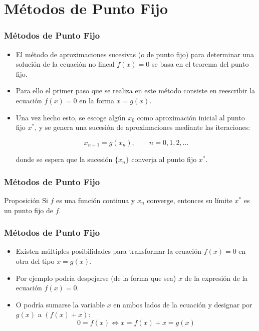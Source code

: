 \documentclass{beamer}
\begin{document}
\section{M\'etodos de Punto Fijo}
\begin{frame}
  \frametitle{M\'etodos de Punto Fijo}
  \begin{itemize}
    \item<1-> El m\'etodo de aproximaciones sucesivas (o de punto fijo) 
    para determinar una soluci\'on de la ecuaci\'on no lineal $f(x)=0$
    se basa en el teorema del punto fijo. 
    \item<2-> Para ello el primer paso que se realiza en este m\'etodo consiste
    en reescribir la ecuaci\'on $f(x)=0$ en la forma $x = g(x)$.
    \item<3-> Una vez hecho esto, se escoge alg\'un $x_0$ como aproximaci\'on inicial al punto fijo
    $x^*$, y se genera una sucesi\'on de aproximaciones mediante las iteraciones:
    \begin{block}{}
        $$
        x_{n+1} = g(x_n), \qquad n=0,1,2,\ldots
        $$
    \end{block}
    donde se espera que la sucesi\'on $\{x_n\}$ converja al punto fijo $x^*$.
  \end{itemize}
\end{frame}
\begin{frame}
  \frametitle{M\'etodos de Punto Fijo}
  \begin{block}{Proposici\'on}
    Si $f$ es una funci\'on continua y $x_n$ converge, entonces su l\'imite $x^*$ es un punto fijo de $f$.
  \end{block}
\end{frame}
\begin{frame}
  \frametitle{M\'etodos de Punto Fijo}
  \begin{itemize}
    \item<1-> Existen m\'ultiples posibilidades para transformar la ecuaci\'on $f(x) = 0$ en otra del tipo $x =
    g(x)$.
    \item<2-> Por ejemplo podr\'ia despejarse (de la forma que sea) $x$ de la expresi\'on de la ecuaci\'on $f (x) = 0$.
    \item<3-> O podr\'ia sumarse la variable $x$ en ambos lados de la ecuaci\'on y designar por $g(x)$ a $(f (x) + x)$:
    $$
      0 = f(x) \Leftrightarrow x = f(x) + x = g(x)
    $$
  \end{itemize}
\end{frame}
\end{document}
